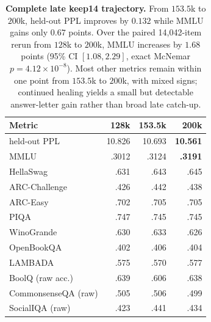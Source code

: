 \begin{table}[t]
\centering
\small
\setlength{\tabcolsep}{4pt}
\begin{tabular}{@{}lrrr@{}}
\toprule
\textbf{Metric} & \textbf{128k} & \textbf{153.5k} & \textbf{200k} \\
\midrule
held-out PPL & 10.826 & 10.693 & \textbf{10.561} \\
MMLU & .3012 & .3124 & \textbf{.3191} \\
HellaSwag & .631 & .643 & .645 \\
ARC-Challenge & .426 & .442 & .438 \\
ARC-Easy & .702 & .705 & .705 \\
PIQA & .747 & .745 & .745 \\
WinoGrande & .630 & .633 & .626 \\
OpenBookQA & .402 & .406 & .404 \\
LAMBADA & .575 & .570 & .577 \\
BoolQ (raw acc.) & .639 & .606 & .638 \\
CommonsenseQA (raw) & .505 & .506 & .499 \\
SocialIQA (raw) & .423 & .441 & .434 \\
\bottomrule
\end{tabular}
\caption{\textbf{Complete late keep14 trajectory.}
From $153.5$k to $200$k, held-out PPL improves by $0.132$ while MMLU gains only
$0.67$ points. Over the paired 14,042-item rerun from $128$k to $200$k, MMLU
increases by $1.68$ points (95\% CI $[1.08,2.29]$, exact McNemar
$p=4.12\times10^{-8}$). Most other metrics remain within one point from
$153.5$k to $200$k, with mixed signs; continued healing yields a small but
detectable answer-letter gain rather than broad late catch-up.}
\label{tab:app-postapex}
\end{table}
